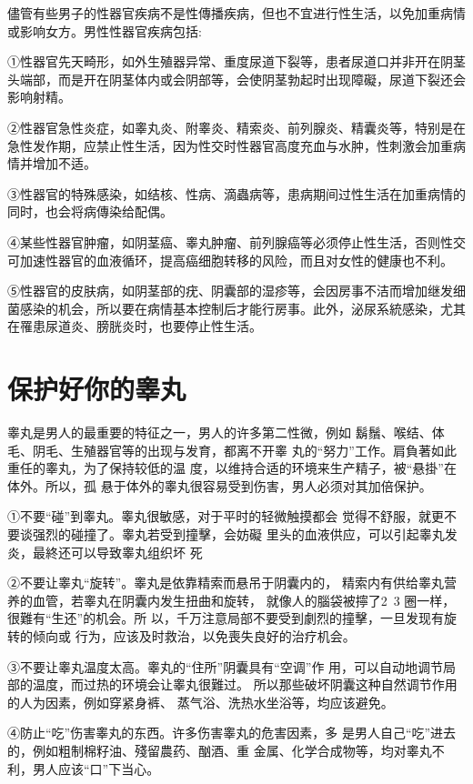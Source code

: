 \documentclass[12pt,UTF8]{ctexbook}
\begin{document}
儘管有些男子的性器官疾病不是性傳播疾病，但也不宜进行性生活，以免加重病情或影响女方。男性性器官疾病包括:

①性器官先天畸形，如外生殖器异常、重度尿道下裂等，患者尿道口并非开在阴茎头端部，而是开在阴茎体内或会阴部等，会使阴茎勃起时出现障礙，尿道下裂还会影响射精。

②性器官急性炎症，如睾丸炎、附睾炎、精索炎、前列腺炎、精囊炎等，特别是在急性发作期，应禁止性生活，因为性交时性器官高度充血与水肿，性刺激会加重病情并增加不适。

③性器官的特殊感染，如结核、性病、滴蟲病等，患病期间过性生活在加重病情的同时，也会将病傳染给配偶。

④某些性器官肿瘤，如阴茎癌、睾丸肿瘤、前列腺癌等必须停止性生活，否则性交可加速性器官的血液循环，提高癌细胞转移的风险，而且对女性的健康也不利。

⑤性器官的皮肤病，如阴茎部的疣、阴囊部的湿疹等，会因房事不洁而增加继发细菌感染的机会，所以要在病情基本控制后才能行房事。此外，泌尿系統感染，尤其在罹患尿道炎、膀胱炎时，也要停止性生活。

\section{保护好你的睾丸}

睾丸是男人的最重要的特征之一，男人的许多第二性微，例如
鬍鬚、喉结、体毛、阴毛、生殖器官等的出现与发育，都离不开睾
丸的“努力”工作。肩負著如此重任的睾丸，为了保持较低的温
度，以维持合适的环境来生产精子，被“悬掛”在体外。所以，孤
悬于体外的睾丸很容易受到伤害，男人必须对其加倍保护。

①不要“碰”到睾丸。睾丸很敏感，对于平时的轻微触摸都会
觉得不舒服，就更不要谈强烈的碰撞了。睾丸若受到撞擊，会妨礙
里头的血液供应，可以引起睾丸发炎，最終还可以导致睾丸组织坏
死

②不要让睾丸“旋转”。睾丸是依靠精索而悬吊于阴囊内的，
精索内有供给睾丸营养的血管，若睾丸在阴囊内发生扭曲和旋转，
就像人的腦袋被擰了2~3 圈一样，很難有“生还”的机会。所
以，千万注意局部不要受到劇烈的撞擊，一旦发现有旋转的倾向或
行为，应该及时救治，以免喪失良好的治疗机会。

③不要让睾丸温度太高。睾丸的“住所”阴囊具有“空调”作
用，可以自动地调节局部的温度，而过热的环境会让睾丸很難过。
所以那些破坏阴囊这种自然调节作用的人为因素，例如穿紧身裤、
蒸气浴、洗热水坐浴等，均应该避免。

④防止“吃”伤害睾丸的东西。许多伤害睾丸的危害因素，多
是男人自己“吃”进去的，例如粗制棉籽油、殘留農药、酗酒、重
金属、化学合成物等，均对睾丸不利，男人应该“口”下当心。
\end{document}
